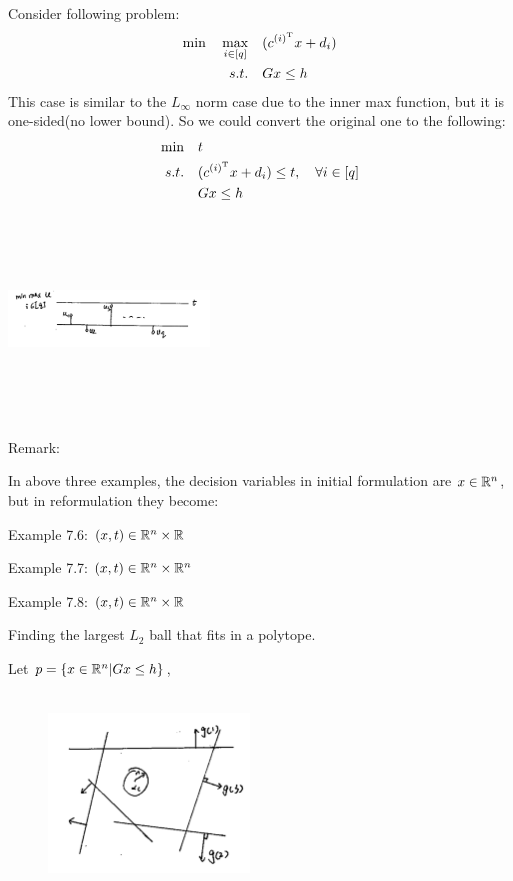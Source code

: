 \begin{example}
	Consider following problem:
	\begin{align*}
		\min \quad \max_{i\in [q]} \quad&(c^{(i)^{{\rm T}}}x + d_i)\\
		s.t. \quad&Gx\leq h
	\end{align*}
	This case is similar to the $L_\infty$ norm case due to the inner max function, but it is one-sided(no lower bound). So we could convert the original one to the following:
	\begin{align*}
		\min \quad &t\\
		s.t. \quad&(c^{(i)^{{\rm T}}}x + d_i)\leq t,\quad \forall i\in [q]\\
		&Gx\leq h
	\end{align*}
	\begin{marginfigure}
		\centering
		\includegraphics[width=2.1in,height=2.1in]{figures/ch07/figure1016_5.png}
	\end{marginfigure}
\end{example}

Remark:

In above three examples, the decision variables in initial formulation are $x\in \mathbb{R}^n$, but in reformulation they become:

Example 7.6: $(x, t) \in \mathbb{R}^n \times \mathbb{R}$

Example 7.7: $(x, t) \in \mathbb{R}^n \times \mathbb{R}^n$

Example 7.8: $(x, t) \in \mathbb{R}^n \times \mathbb{R}$



\begin{example}
	Finding the largest $L_2$ ball that fits in a polytope.
	
	Let $p = \{x\in \mathbb{R}^n| Gx\leq h \}$,
	
	\begin{figure}
		\centering
		\includegraphics[width=2.1in,height=2.1in]{figures/ch07/figure1016_6.png}
	\end{figure}
\end{example}

